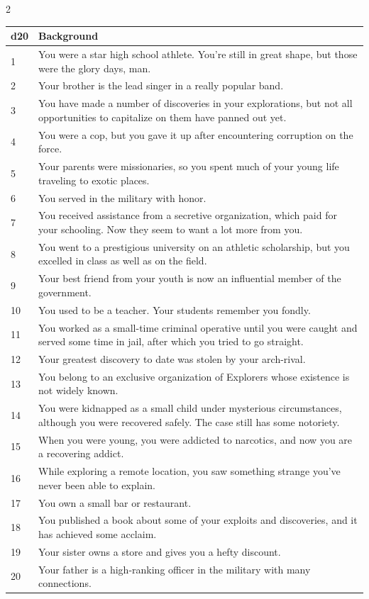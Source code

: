 \begin{multicols}{2}
\begin{table}
\begin{tabularx}{\textwidth}{| p{} | p{} |}
\hline
\textbf{d20} & \textbf{Background} \\
\hline
1 & You were a star high school athlete. You’re still in great shape, but those were the glory days, man. \\ \hline
2 & Your brother is the lead singer in a really popular band. \\ \hline
3 & You have made a number of discoveries in your explorations, but not all opportunities to capitalize on them have panned out yet.  \\ \hline
4 & You were a cop, but you gave it up after encountering corruption on the force.  \\ \hline
5 & Your parents were missionaries, so you spent much of your young life traveling to exotic places. \\ \hline
6 & You served in the military with honor. \\ \hline
7 & You received assistance from a secretive organization, which paid for your schooling. Now they seem to want a lot more from you. \\ \hline
8 & You went to a prestigious university on an athletic scholarship, but you excelled in class as well as on the field.  \\ \hline
9 & Your best friend from your youth is now an influential member of the government.  \\ \hline
10 & You used to be a teacher. Your students remember you fondly. \\ \hline
11 & You worked as a small-time criminal operative until you were caught and served some time in jail, after which you tried to go straight. \\ \hline
12 & Your greatest discovery to date was stolen by your arch-rival. \\ \hline
13 & You belong to an exclusive organization of Explorers whose existence is not widely known. \\ \hline
14 & You were kidnapped as a small child under mysterious circumstances, although you were recovered safely. The case still has some notoriety. \\ \hline
15 & When you were young, you were addicted to narcotics, and now you are a recovering addict. \\ \hline
16 & While exploring a remote location, you saw something strange you’ve never been able to explain. \\ \hline
17 & You own a small bar or restaurant. \\ \hline
18 & You published a book about some of your exploits and discoveries, and it has achieved some acclaim. \\ \hline
19 & Your sister owns a store and gives you a hefty discount. \\ \hline
20 & Your father is a high-ranking officer in the military with many connections. \\ \hline


\end{tabularx}
\end{table}
\end{multicols}
